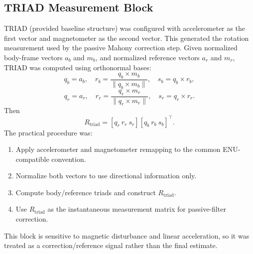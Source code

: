 \documentclass[12pt,a4paper]{article}
\begin{document}
\subsection{TRIAD Measurement Block}
TRIAD (provided baseline structure) was configured with accelerometer as the first vector and magnetometer as the second vector. This generated the rotation measurement used by the passive Mahony correction step.
Given normalized body-frame vectors $a_b$ and $m_b$, and normalized reference vectors $a_r$ and $m_r$, TRIAD was computed using orthonormal bases:
\[
q_b = a_b,\quad r_b = \frac{q_b \times m_b}{\|q_b \times m_b\|},\quad s_b = q_b \times r_b,
\]
\[
q_r = a_r,\quad r_r = \frac{q_r \times m_r}{\|q_r \times m_r\|},\quad s_r = q_r \times r_r.
\]
Then
\[
R_{\text{triad}} = [q_r\ r_r\ s_r][q_b\ r_b\ s_b]^\top.
\]
The practical procedure was:
\begin{enumerate}[leftmargin=1.5em]
    \item Apply accelerometer and magnetometer remapping to the common ENU-compatible convention.
    \item Normalize both vectors to use directional information only.
    \item Compute body/reference triads and construct $R_{\text{triad}}$.
    \item Use $R_{\text{triad}}$ as the instantaneous measurement matrix for passive-filter correction.
\end{enumerate}
This block is sensitive to magnetic disturbance and linear acceleration, so it was treated as a correction/reference signal rather than the final estimate.
\end{document}
